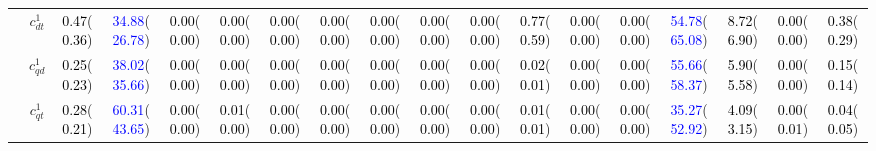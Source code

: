 \documentclass{article}
\begin{document}
\begin{landscape}
\begin{table}[H]
\begin{tabular}{|c|c|c|c|c|c|c|c|c|c|c|c|c|c|c|c|c|c|}
 & $c_{dt}^{1}$ & \textcolor{black}{0.47}(\textcolor{black}{0.36}) & \textcolor{blue}{34.88}(\textcolor{blue}{26.78}) & \textcolor{black}{0.00}(\textcolor{black}{0.00}) & \textcolor{black}{0.00}(\textcolor{black}{0.00}) & \textcolor{black}{0.00}(\textcolor{black}{0.00}) & \textcolor{black}{0.00}(\textcolor{black}{0.00}) & \textcolor{black}{0.00}(\textcolor{black}{0.00}) & \textcolor{black}{0.00}(\textcolor{black}{0.00}) & \textcolor{black}{0.00}(\textcolor{black}{0.00}) & \textcolor{black}{0.77}(\textcolor{black}{0.59}) & \textcolor{black}{0.00}(\textcolor{black}{0.00}) & \textcolor{black}{0.00}(\textcolor{black}{0.00}) & \textcolor{blue}{54.78}(\textcolor{blue}{65.08}) & \textcolor{black}{8.72}(\textcolor{black}{6.90}) & \textcolor{black}{0.00}(\textcolor{black}{0.00}) & \textcolor{black}{0.38}(\textcolor{black}{0.29})\\ \cline{2-18}
 & $c_{qd}^{1}$ & \textcolor{black}{0.25}(\textcolor{black}{0.23}) & \textcolor{blue}{38.02}(\textcolor{blue}{35.66}) & \textcolor{black}{0.00}(\textcolor{black}{0.00}) & \textcolor{black}{0.00}(\textcolor{black}{0.00}) & \textcolor{black}{0.00}(\textcolor{black}{0.00}) & \textcolor{black}{0.00}(\textcolor{black}{0.00}) & \textcolor{black}{0.00}(\textcolor{black}{0.00}) & \textcolor{black}{0.00}(\textcolor{black}{0.00}) & \textcolor{black}{0.00}(\textcolor{black}{0.00}) & \textcolor{black}{0.02}(\textcolor{black}{0.01}) & \textcolor{black}{0.00}(\textcolor{black}{0.00}) & \textcolor{black}{0.00}(\textcolor{black}{0.00}) & \textcolor{blue}{55.66}(\textcolor{blue}{58.37}) & \textcolor{black}{5.90}(\textcolor{black}{5.58}) & \textcolor{black}{0.00}(\textcolor{black}{0.00}) & \textcolor{black}{0.15}(\textcolor{black}{0.14})\\ \cline{2-18}
 & $c_{qt}^{1}$ & \textcolor{black}{0.28}(\textcolor{black}{0.21}) & \textcolor{blue}{60.31}(\textcolor{blue}{43.65}) & \textcolor{black}{0.00}(\textcolor{black}{0.00}) & \textcolor{black}{0.01}(\textcolor{black}{0.00}) & \textcolor{black}{0.00}(\textcolor{black}{0.00}) & \textcolor{black}{0.00}(\textcolor{black}{0.00}) & \textcolor{black}{0.00}(\textcolor{black}{0.00}) & \textcolor{black}{0.00}(\textcolor{black}{0.00}) & \textcolor{black}{0.00}(\textcolor{black}{0.00}) & \textcolor{black}{0.01}(\textcolor{black}{0.01}) & \textcolor{black}{0.00}(\textcolor{black}{0.00}) & \textcolor{black}{0.00}(\textcolor{black}{0.00}) & \textcolor{blue}{35.27}(\textcolor{blue}{52.92}) & \textcolor{black}{4.09}(\textcolor{black}{3.15}) & \textcolor{black}{0.00}(\textcolor{black}{0.01}) & \textcolor{black}{0.04}(\textcolor{black}{0.05})\\ \cline{2-18}

\end{tabular}
\end{table}
\end{landscape}
\end{document}

